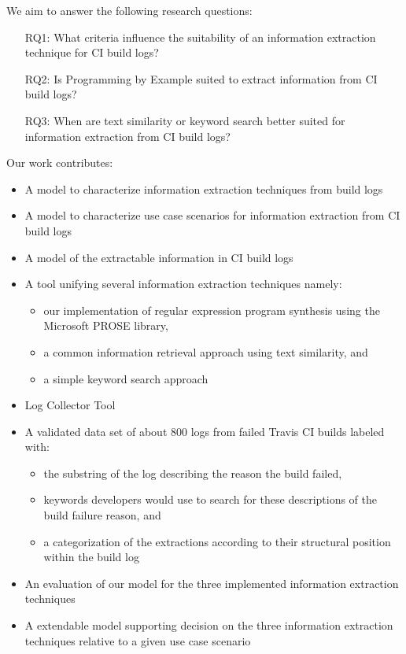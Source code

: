 \documentclass[\myrootdir/main.tex]{subfiles}
\begin{document}

We aim to answer the following research questions:

\begin{itemize}
  \item[RQ1:] What criteria influence the suitability of an information extraction technique for CI build logs?
  \item[RQ2:] Is Programming by Example suited to extract information from CI build logs?
  \item[RQ3:] When are text similarity or keyword search better suited for information extraction from CI build logs?
\end{itemize}


Our work contributes:

\begin{itemize}
  \item A model to characterize information extraction techniques from  build logs
  \item A model to characterize use case scenarios for information extraction from CI build logs
  \item A model of the extractable information in CI build logs
  \item A tool unifying several information extraction techniques namely:
        \begin{itemize}
          \item our implementation of regular expression program synthesis using the Microsoft PROSE library,
          \item a common information retrieval approach using text similarity, and
          \item a simple keyword search approach
        \end{itemize}
  \item Log Collector Tool
  \item A validated data set of about 800 logs from failed Travis CI builds labeled with:
        \begin{itemize}
          \item the substring of the log describing the reason the build failed,
          \item keywords developers would use to search for these descriptions of the build failure reason, and
          \item a categorization of the extractions according to their structural position within the build log
        \end{itemize}
  \item An evaluation of our model for the three implemented information extraction techniques 
  \item A extendable model  supporting decision on the three information extraction techniques relative to a given use case scenario
\end{itemize}
\end{document}
